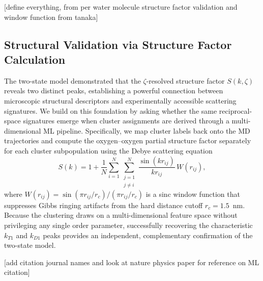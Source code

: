 \documentclass[aps, amsmath,amssymb, reprint, twocolumn, superscriptaddress]{revtex4-2}
\begin{document}
[define everything, from per water molecule structure factor validation and window function from tanaka]
\subsection{Structural Validation via Structure Factor Calculation}
\label{sec:structure_factor}
The two-state model demonstrated that the $\zeta$-resolved structure factor $S(k,\zeta)$ reveals two distinct peaks, establishing a powerful connection between microscopic structural descriptors and experimentally accessible scattering signatures. We build on this foundation by asking whether the same reciprocal-space signatures emerge when cluster assignments are derived through a multi-dimensional ML pipeline. Specifically, we map cluster labels back onto the MD trajectories and compute the oxygen--oxygen partial structure factor separately for each cluster subpopulation using the Debye scattering equation~\cite{debye-1915}
\begin{equation}
S(k) = 1 + \frac{1}{N}\sum_{i=1}^{N}\sum_{\substack{j=1 \\ j\neq i}}^{N}\frac{\sin(k r_{ij})}{k r_{ij}}\,W(r_{ij}),
\label{eq:debye}
\end{equation}
where $W(r_{ij}) = \sin(\pi r_{ij}/r_c)/(\pi r_{ij}/r_c)$ is a sinc window function that suppresses Gibbs ringing artifacts from the hard distance cutoff $r_c = 1.5$~nm. Because the clustering draws on a multi-dimensional feature space without privileging any single order parameter, successfully recovering the characteristic $k_{T1}$ and $k_{D1}$ peaks provides an independent, complementary confirmation of the two-state model.

[add citation journal names and look at nature physics paper for reference on ML citation]

\FloatBarrier

\newpage


\end{document}

